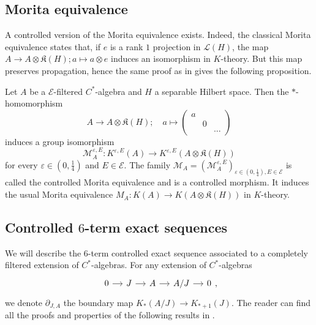 \subsection{Morita equivalence}

A controlled version of the Morita equivalence exists. Indeed, the classical Morita equivalence states that, if $e$ is a rank $1$ projection in $\mathcal L (H)$, the map $A\rightarrow A\otimes \mathfrak K(H) ; a\mapsto a\otimes e$ induces an isomorphism in $K$-theory. But this map preserves propagation, hence the same proof as in \cite{OY2} gives the following proposition.

\begin{prop}
Let $A$ be a $\mathcal E$-filtered $C^*$-algebra and $H$ a separable Hilbert space. Then the $*$-homomorphism
\[A\rightarrow A\otimes \mathfrak K(H) ; \quad a\mapsto 
\begin{pmatrix}a & & \\  & 0 & \\ & & ... \end{pmatrix}\]
induces a group isomorphism 
\[\mathcal M_A^{\varepsilon,E} : K^{\varepsilon,E}(A)\rightarrow K^{\varepsilon,E}(A\otimes \mathfrak K(H)) \]
for every $\varepsilon\in(0,\frac{1}{4})$ and $E\in\mathcal E$. The family $\mathcal M_A = (\mathcal M_A^{\varepsilon,E} )_{\varepsilon\in(0,\frac{1}{4}),E\in\mathcal E}$ is called the controlled Morita equivalence and is a controlled morphism. It induces the usual Morita equivalence $M_A: K(A)\rightarrow K(A\otimes \mathfrak K(H))$ in $K$-theory. 
\end{prop}

\subsection{Controlled $6$-term exact sequences}

We will describe the $6$-term controlled exact sequence associated to a completely filtered extension of $C^*$-algebras. For any extension of $C^*$-algebras 
\[\begin{tikzcd}[column sep = small]0\arrow{r} & J\arrow{r} & A\arrow{r} & A/J\arrow{r} & 0 \end{tikzcd},\]
we denote $\partial_{J,A}$ the boundary map $K_*(A/J)\rightarrow K_{*+1}(J)$. The reader can find all the proofs and properties of the following results in \cite{OY2}.\\

